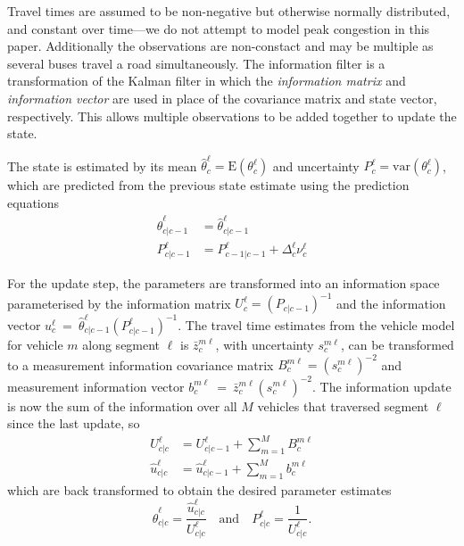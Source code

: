 Travel times are assumed to be non-negative but otherwise normally distributed,
and constant over time---we do not attempt to model peak congestion in this paper.
Additionally the observations are non-constact and may be multiple as several buses travel
a road simultaneously.
The information filter is a transformation of the Kalman filter in which the
\emph{information matrix} and \emph{information vector} are used in place of 
the covariance matrix and state vector, respectively.
This allows multiple observations to be added together to update the state.



The state is estimated by its mean $\hat \theta_c^\ell = \mathrm{E}(\theta_c^\ell)$
and uncertainty $P_c^\ell = \mathrm{var}(\theta_c^\ell)$,
which are predicted from the previous state estimate using the prediction
equations
\begin{align*}
\label{eq:kf_transition}
\hat \theta^\ell_{c|c-1} &= \hat \theta^\ell_{c|c-1} \\
P^\ell_{c|c-1} &= P^\ell_{c-1|c-1} + \Delta_c^\ell \nu_c^\ell
\end{align*}

For the update step, the parameters are transformed into an information
space parameterised by the information matrix $U^\ell_c = (P_{c|c-1})^{-1}$
and the information vector $u^\ell_c~=~\hat \theta^\ell_{c|c-1} (P^\ell_{c|c-1})^{-1}$.
The travel time estimates from the vehicle model for vehicle $m$ along segment $\ell$
is $\bar z_c^{m\ell}$, with uncertainty $s^{m\ell}_c$,
can be transformed to a measurement information covariance matrix 
$B_c^{m\ell} = (s^{m\ell}_c)^{-2}$
and measurement information vector $b_c^{m\ell}~=~\bar z^{m\ell}_c (s^{m\ell}_c)^{-2}$.
The information update is now the sum of the information over all $M$ vehicles
that traversed segment $\ell$ since the last update, so
\begin{align*}
U^\ell_{c|c} &= U^\ell_{c|c-1} + \sum_{m=1}^M B^{m\ell}_{c} \\
\hat u^\ell_{c|c} &= \hat u^\ell_{c|c-1} + \sum_{m=1}^M b^{m\ell}_{c}
\end{align*}
which are back transformed to obtain the desired parameter estimates
\begin{equation*}
\hat \theta^\ell_{c|c} = \frac{\hat u^\ell_{c|c}}{U^\ell_{c|c}} 
\quad\text{and}\quad
P^\ell_{c|c} = \frac{1}{U^\ell_{c|c}}.
\end{equation*}



